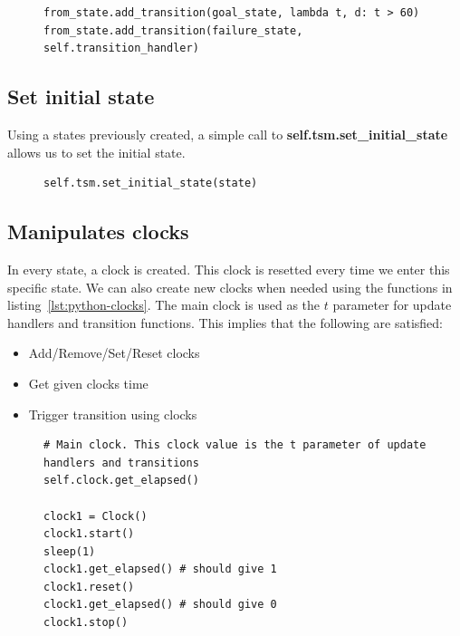 \documentclass[12pt]{article}
\theoremstyle{definition}
\theoremstyle{definition}
\theoremstyle{remark}
\begin{document}
\begin{figure}[H]
    \begin{lstlisting}[caption="Add transition to any state",label={lst:python-add-transition}]
from_state.add_transition(goal_state, lambda t, d: t > 60)
from_state.add_transition(failure_state, self.transition_handler)
    \end{lstlisting}
\end{figure}


\subsection{Set initial state}

Using a states previously created, a simple call to \textbf{self.tsm.set\_initial\_state} allows us to set the initial state.

\begin{figure}[H]
    \begin{lstlisting}[caption="Set the initial state",label={lst:python-set-initial-state}]
self.tsm.set_initial_state(state)
    \end{lstlisting}
\end{figure}


\subsection{Manipulates clocks}

In every state, a clock is created. This clock is resetted every time we enter this specific state. We can also create new clocks when needed using the functions in listing~\ref{lst:python-clocks}. The main clock is used as the $t$ parameter for update handlers and transition functions. This implies that the following are satisfied:
\begin{itemize}
\item Add/Remove/Set/Reset clocks
\item Get given clocks time
\item Trigger transition using clocks
\end{itemize}


\begin{figure}[H]
    \begin{lstlisting}[caption="Set the initial state",label={lst:python-clocks}]
# Main clock. This clock value is the t parameter of update handlers and transitions
self.clock.get_elapsed()

clock1 = Clock()
clock1.start()
sleep(1)
clock1.get_elapsed() # should give 1
clock1.reset()
clock1.get_elapsed() # should give 0
clock1.stop()
    \end{lstlisting}
\end{figure}
\end{document}
